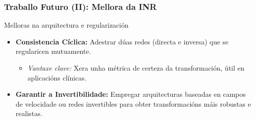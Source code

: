 \documentclass[xcolor=dvipsnames]{beamer}
\begin{document}
\begin{frame}
    \frametitle{Traballo Futuro (II): Mellora da INR}

    \begin{block}{Melloras na arquitectura e regularización}
        \begin{itemize}
            \item \textbf{Consistencia Cíclica:} Adestrar dúas redes (directa e inversa) que se regularicen mutuamente.
            \begin{itemize}
                \item \textit{Vantaxe clave:} Xera unha métrica de certeza da transformación, útil en aplicacións clínicas.
            \end{itemize}
            \item \textbf{Garantir a Invertibilidade:} Empregar arquitecturas baseadas en campos de velocidade ou redes invertibles para obter transformacións máis robustas e realistas.
        \end{itemize}
    \end{block}


\end{frame}
\end{document}

